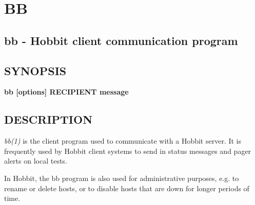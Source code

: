 \chapter{BB}

\section{bb - Hobbit client communication program }


\section{SYNOPSIS}
\textbf{bb [options] RECIPIENT message}

\section{DESCRIPTION}
\emph{bb(1)} is the client program used to communicate with a Hobbit
server. It is frequently used by Hobbit client systems to send in
status messages and pager alerts on local tests. 


In Hobbit, the bb program is also used for administrative purposes,
e.g. to rename or delete hosts, or to disable hosts that are down for
longer periods of time. 

